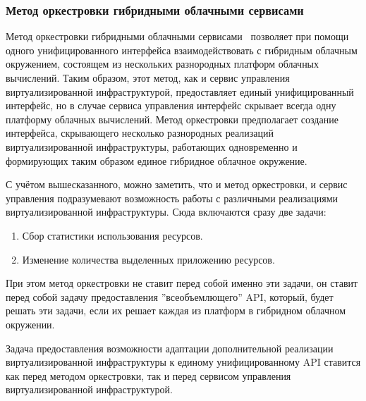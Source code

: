 \subsubsection*{Метод оркестровки гибридными облачными сервисами}
Метод оркестровки гибридными облачными сервисами~\cite{orchestrating-hybrid-cloud-services} позволяет при помощи одного унифицированного интерфейса взаимодействовать с гибридным облачным окружением, состоящем из нескольких разнородных платформ облачных вычислений.
Таким образом, этот метод, как и сервис управления виртуализированной инфраструктурой, предоставляет единый унифицированный интерфейс, но в случае сервиса управления интерфейс скрывает всегда одну платформу облачных вычислений.
Метод оркестровки предполагает создание интерфейса, скрывающего несколько разнородных реализаций виртуализированной инфраструктуры, работающих одновременно и формирующих таким образом единое гибридное облачное окружение.

С учётом вышесказанного, можно заметить, что и метод оркестровки, и сервис управления подразумевают возможность работы с различными реализациями виртуализированной инфраструктуры.
Сюда включаются сразу две задачи:
\begin{enumerate}
    \item Сбор статистики использования ресурсов.
    \item Изменение количества выделенных приложению ресурсов.
\end{enumerate}
При этом метод оркестровки не ставит перед собой именно эти задачи, он ставит перед собой задачу предоставления ''всеобъемлющего'' API, который, будет решать эти задачи, если их решает каждая из платформ в гибридном облачном окружении.

Задача предоставления возможности адаптации дополнительной реализации виртуализированной инфраструктуры к единому унифицированному API ставится как перед методом оркестровки, так и перед сервисом управления виртуализированной инфраструктурой.
